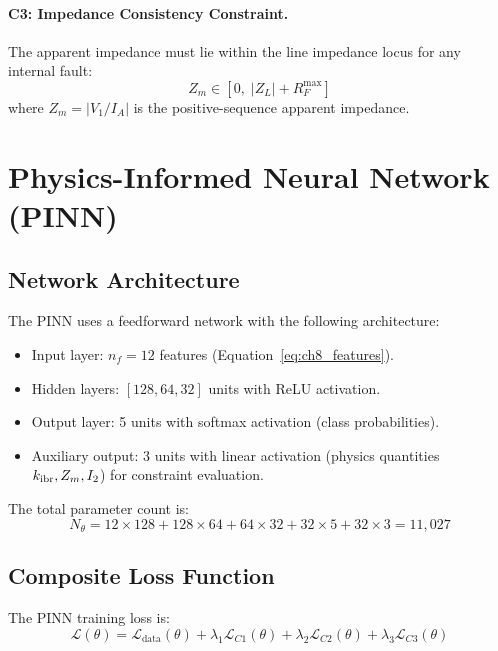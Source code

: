 \paragraph{C3: Impedance Consistency Constraint.}
The apparent impedance must lie within the line impedance locus for any
internal fault:
\begin{equation}
  Z_m \in [0,\; |Z_L| + R_F^\mathrm{max}]
  \label{eq:ch8_c3}
\end{equation}
where $Z_m = |V_1/I_A|$ is the positive-sequence apparent impedance.

\section{Physics-Informed Neural Network (PINN)}
\label{sec:ch8_pinn}

\subsection{Network Architecture}

The PINN uses a feedforward network with the following architecture:
\begin{itemize}
\item Input layer: $n_f = 12$ features (Equation~\ref{eq:ch8_features}).
\item Hidden layers: $[128, 64, 32]$ units with ReLU activation.
\item Output layer: 5 units with softmax activation (class probabilities).
\item Auxiliary output: 3 units with linear activation (physics quantities
      $k_{\mathrm{ibr}}, Z_m, I_2$) for constraint evaluation.
\end{itemize}
The total parameter count is:
\begin{equation}
  N_\theta = 12 \times 128 + 128 \times 64 + 64 \times 32 + 32 \times 5
  + 32 \times 3 = 11{,}027
  \label{eq:ch8_params}
\end{equation}

\subsection{Composite Loss Function}

The PINN training loss is:
\begin{equation}
  \mathcal{L}(\theta) = \mathcal{L}_\mathrm{data}(\theta)
    + \lambda_1 \mathcal{L}_{C1}(\theta)
    + \lambda_2 \mathcal{L}_{C2}(\theta)
    + \lambda_3 \mathcal{L}_{C3}(\theta)
  \label{eq:ch8_loss}
\end{equation}

